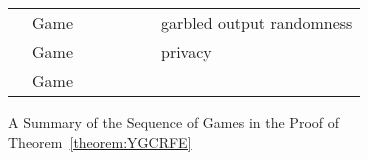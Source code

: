 \begin{figure}
\begin{tabular}{|C{.5cm}|c|C{2.5cm}|C{2.5cm}|C{2.5cm}|C{2.5cm}|C{2.5cm}|}
& Game~ & & &  & & garbled output randomness \\ \hhline{~------}
& Game~ & & & &  & privacy \\ \hhline{~------}
& Game~ &  &  & &  & \\ \hline

\end{tabular}
\caption{A Summary of the Sequence of Games in the Proof of Theorem~\ref{theorem:YGCRFE}
}
\label{fig:YGCRFEproofsummary}
\end{figure}

